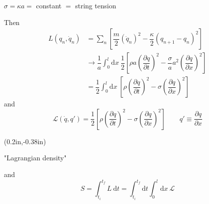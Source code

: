 \documentclass{article}
\begin{document}
$\sigma = \kappa a =$ constant $=$ string tension

\noindent Then
\begin{align*}
    L ( q_n, \dot{q}_n ) &= \sum_n \left[ \dfrac{m}{2} ( \dot{q}_n )^2 - \dfrac{\kappa}{2} ( q_{n+1} - q_n )^2 \right] \\
    &\rightarrow \dfrac{1}{a} \int_0^l \mathrm{d}x~ \dfrac{1}{2} \left[ \rho a { \left( \dfrac{ \partial q }{ \partial t } \right) }^2 - \dfrac{\sigma}{a} a^2 { \left( \dfrac{ \partial q }{ \partial x } \right) }^2 \right] \\
    &= \dfrac{1}{2} \int_0^l \mathrm{d}x~ \left[ \rho { \left( \dfrac{ \partial q }{ \partial t } \right) }^2 - \sigma { \left( \dfrac{ \partial q }{ \partial x } \right) }^2 \right]
\end{align*}
and
\begin{equation*}
    \mathscr{L} ( \dot{q}, q' ) = \dfrac{1}{2} \left[ \rho { \left( \dfrac{ \partial q }{ \partial t } \right) }^2 - \sigma { \left( \dfrac{ \partial q }{ \partial x } \right) }^2 \right] %
    \qquad \boxed{ q' \equiv \dfrac{ \partial q }{ \partial x } }
\end{equation*}
{%
\begin{textblock*}{2in}(0.2in,-0.38in)%
\begin{minipage}[h!]{2in}
    "Lagrangian density"
\end{minipage}%
\end{textblock*}%
}%
and
\begin{equation*}
    S = \int_{t_i}^{t_f} L ~ \mathrm{d}t = \int_{t_i}^{t_f} \mathrm{d}t \int_0^l \mathrm{d}x~ \mathscr{L}
\end{equation*}

\end{document}
